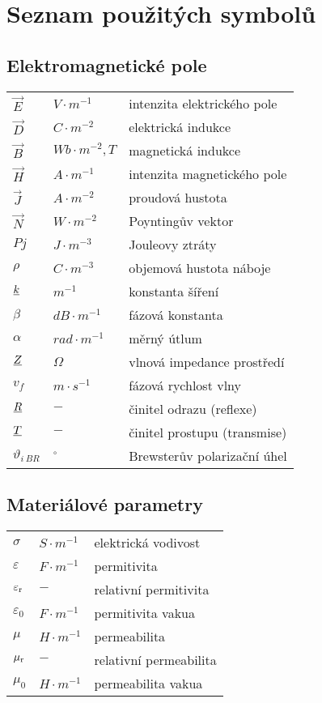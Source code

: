\chapter*{Seznam použitých symbolů}

\section*{Elektromagnetické pole}
\begin{tabular}{lll}
	$\vec{E}$ 	& $\unit{V\cdot m^{-1}}$ 	& intenzita elektrického pole\\
	$\vec{D}$ 	& $\unit{C\cdot m^{-2}}$ 	& elektrická indukce\\
	$\vec{B}$ 	& $\unit{Wb\cdot m^{-2}},\unit{T}$ & magnetická indukce\\
	$\vec{H}$ 	& $\unit{A\cdot m^{-1}}$ 	& intenzita magnetického pole\\
    $\vec{J}$ 	& $\unit{A\cdot m^{-2}}$ 	& proudová hustota\\
    $\vec{N}$ 	& $\unit{W\cdot m^{-2}}$ 	& Poyntingův vektor\\
    $P{j}$ 		& $\unit{J\cdot m^{-3}}$ 	& Jouleovy ztráty\\
	$\rho$		& $\unit{C\cdot m^{-3}}$	& objemová hustota náboje\\
    ${\underline{k}}$ 	& $\unit{m^{-1}}$ 			& konstanta šíření\\
    $\beta$		& $\unit{dB\cdot m^{-1}}$	& fázová konstanta\\
    $\alpha$	& $\unit{rad\cdot m^{-1}}$	& měrný útlum\\
    ${\underline{Z}}$	& $\unit{\Omega}$			& vlnová impedance prostředí\\
    $v_{f}$	    & $\unit{m\cdot s^{-1}}$	& fázová rychlost vlny\\
    ${\underline{R}}$ 	& $\unit{-}$ 				& činitel odrazu (reflexe)\\   
    ${\underline{T}}$ 	& $\unit{-}$ 				& činitel prostupu (transmise)\\
    $\vartheta_{i\ BR}$ & $\unit{^{\circ}}$	& Brewsterův polarizační úhel\\
\end{tabular}

\section*{Materiálové parametry}
\begin{tabular}{lll}
	$\sigma$ & $\unit{S\cdot m^{-1}}$ & elektrická vodivost\\
	$\varepsilon$ & $\unit{F\cdot m^{-1}}$ & permitivita\\
	$\varepsilon_{\rm{r}}$ & $\unit{-}$ & relativní permitivita\\
    $\varepsilon_0$ & $\unit{F\cdot m^{-1}}$ & permitivita vakua\\
	$\mu$ & $\unit{H\cdot m^{-1}}$ & permeabilita\\
	$\mu_{\rm{r}}$ & $\unit{-}$ & relativní permeabilita\\
	$\mu_0$ & $\unit{H\cdot m^{-1}}$ & permeabilita vakua\\
\end{tabular}

